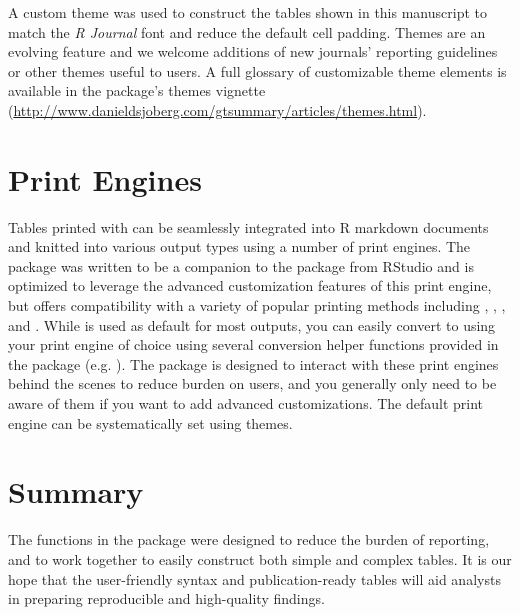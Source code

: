 A custom theme was used to construct the  tables shown in this manuscript to match the \emph{R Journal} font and reduce the default cell padding. 
Themes are an evolving feature and we welcome additions of new journals' reporting guidelines or other themes useful to users.
A full glossary of customizable theme elements is available in the package's themes vignette (\url{http://www.danieldsjoberg.com/gtsummary/articles/themes.html}).

\section{Print Engines}

Tables printed with  can be seamlessly integrated into R markdown documents and knitted into various output types using a number of print engines.
The package was written to be a companion to the  package from RStudio and is optimized to leverage the advanced customization features of this print engine, but offers compatibility with a variety of popular printing methods including  \citep{knitr},   \citep{flextable},  \citep{huxtable}, and  \citep{kableExtra}.
While  is used as default for most outputs, you can easily convert to using your print engine of choice using several conversion helper functions provided in the package (e.g. ).
The package is designed to interact with these print engines behind the scenes to reduce burden on users, and you generally only need to be aware of them if you want to add advanced customizations.
The default print engine can be systematically set using  themes.

\section{Summary}

The functions in the  package were designed to reduce the burden of reporting, and to work together to easily construct both simple and complex tables.
It is our hope that the user-friendly syntax and publication-ready tables will aid analysts in preparing reproducible and high-quality findings.



\address{Daniel D. Sjoberg\\
  Memorial Sloan Kettering Cancer Center\\
  1275 York Ave., New York, New York 10022\\
  USA\\
  ORCiD: 0000-0003-0862-2018\\
  }

